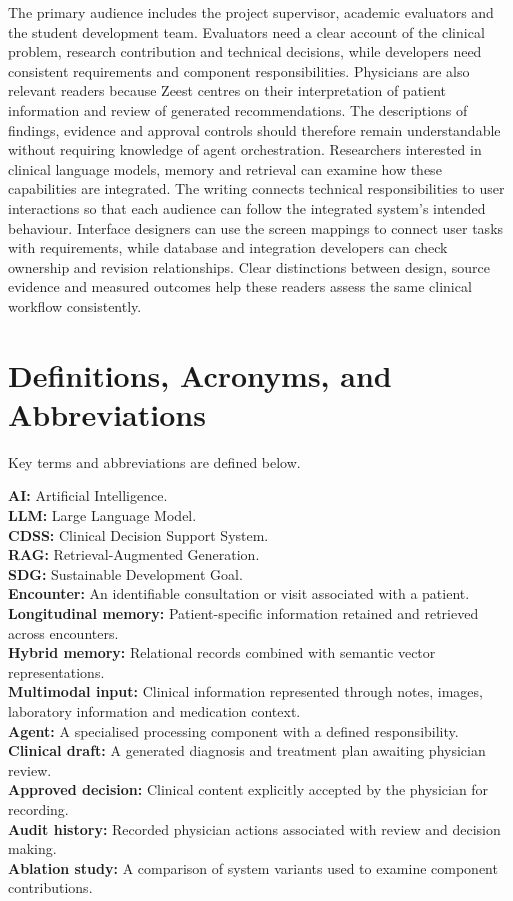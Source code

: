 The primary audience includes the project supervisor, academic evaluators and the student development team. Evaluators need a clear account of the clinical problem, research contribution and technical decisions, while developers need consistent requirements and component responsibilities. Physicians are also relevant readers because Zeest centres on their interpretation of patient information and review of generated recommendations. The descriptions of findings, evidence and approval controls should therefore remain understandable without requiring knowledge of agent orchestration. Researchers interested in clinical language models, memory and retrieval can examine how these capabilities are integrated. The writing connects technical responsibilities to user interactions so that each audience can follow the integrated system's intended behaviour. Interface designers can use the screen mappings to connect user tasks with requirements, while database and integration developers can check ownership and revision relationships. Clear distinctions between design, source evidence and measured outcomes help these readers assess the same clinical workflow consistently.

\section{Definitions, Acronyms, and Abbreviations}

Key terms and abbreviations are defined below.

\noindent\textbf{AI:} Artificial Intelligence.\\
\noindent\textbf{LLM:} Large Language Model.\\
\noindent\textbf{CDSS:} Clinical Decision Support System.\\
\noindent\textbf{RAG:} Retrieval-Augmented Generation.\\
\noindent\textbf{SDG:} Sustainable Development Goal.\\
\noindent\textbf{Encounter:} An identifiable consultation or visit associated with a patient.\\
\noindent\textbf{Longitudinal memory:} Patient-specific information retained and retrieved across encounters.\\
\noindent\textbf{Hybrid memory:} Relational records combined with semantic vector representations.\\
\noindent\textbf{Multimodal input:} Clinical information represented through notes, images, laboratory information and medication context.\\
\noindent\textbf{Agent:} A specialised processing component with a defined responsibility.\\
\noindent\textbf{Clinical draft:} A generated diagnosis and treatment plan awaiting physician review.\\
\noindent\textbf{Approved decision:} Clinical content explicitly accepted by the physician for recording.\\
\noindent\textbf{Audit history:} Recorded physician actions associated with review and decision making.\\
\noindent\textbf{Ablation study:} A comparison of system variants used to examine component contributions.


